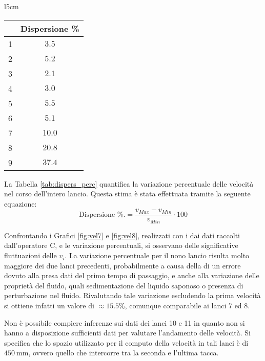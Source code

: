 \documentclass[a4paper,11pt,oneside]{article}
\begin{document}
\begin{wraptable}{l}{5cm}
    \centering
    \begin{tabular}{|c|c|}
        \hline
        & Dispersione \% \\ \hline
        \rowcolor[rgb]{0.85,0.85,0.85}1& $3.5$ \\ \hline
        2& $5.2$ \\ \hline
        \rowcolor[rgb]{0.85,0.85,0.85}3& $2.1$ \\ \hline
        4& $3.0$ \\ \hline
        \rowcolor[rgb]{0.85,0.85,0.85}5& $5.5$ \\ \hline
        6& $5.1$ \\ \hline
        \rowcolor[rgb]{0.85,0.85,0.85}7& $10.0$ \\ \hline
        8& $20.8$ \\ \hline
        \rowcolor[rgb]{0.85,0.85,0.85}9& $37.4$ \\ \hline
    \end{tabular}
    \caption{Dispersioni\\ Percentuali}
    \label{tab:dispers_perc}
\end{wraptable}


La Tabella \ref{tab:dispers_perc} quantifica la variazione percentuale delle velocità nel corso dell'intero lancio. Questa stima è stata effettuata tramite la seguente equazione:
\begin{equation*}
    \text{Dispersione \%.} = \frac{v_{Max}- v_{Min}}{v_{Min}} \cdot 100
\end{equation*}

Confrontando i Grafici \ref{fig:vel7} e \ref{fig:vel8}, realizzati con i dai dati raccolti dall'operatore C, e le variazione percentuali, si osservano delle significative fluttuazioni delle $v_{i}$.
La variazione percentuale per il nono lancio risulta molto maggiore dei due lanci precedenti, probabilmente a causa della di un errore dovuto alla presa dati del primo tempo di passaggio, e anche alla variazione delle proprietà del fluido, quali sedimentazione del liquido saponoso o presenza di perturbazione nel fluido. Rivalutando tale variazione escludendo la prima velocità si ottiene infatti un valore di $\approx 15.5\%$, comunque comparabile ai lanci 7 ed 8.

Non è possibile compiere inferenze sui dati dei lanci 10 e 11 in quanto non si hanno a disposizione sufficienti dati per valutare l'andamento delle velocità. Si specifica che lo spazio utilizzato per il computo della velocità in tali lanci è di $\SI{450}{\milli\meter}$, ovvero quello che intercorre tra la seconda e l'ultima tacca.\\
\end{document}
